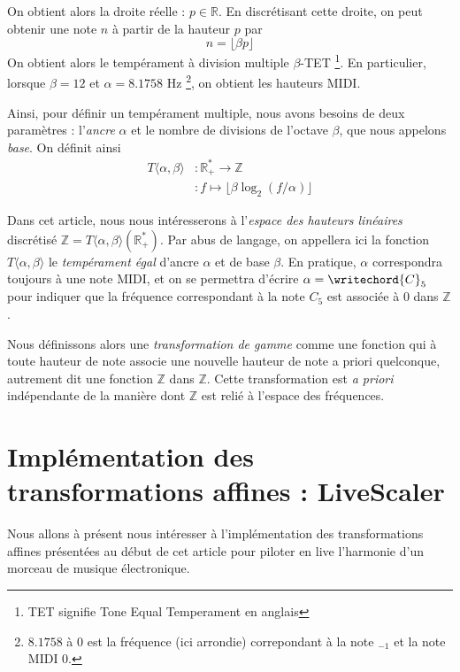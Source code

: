\documentclass{article}
\begin{document}
On obtient alors la droite réelle : $p\in \mathbb{R}$. En discrétisant cette droite, on peut obtenir une note $n$ à partir de la hauteur $p$ par 
$$n = \lfloor \beta p \rfloor$$
On obtient alors le tempérament à division multiple $\beta$-TET \footnote{TET signifie Tone Equal Temperament en anglais}. En particulier, lorsque $\beta = 12$ et $\alpha = 8.1758$ Hz \footnote{ $8.1758$ à $0$ est la fréquence (ici arrondie) correpondant à la note $_{-1}$ et la note MIDI $0$.}, on obtient les hauteurs MIDI.

Ainsi, pour définir un tempérament multiple, nous avons besoins de deux paramètres : l'\emph{ancre} $\alpha$  et le nombre de divisions de l'octave $\beta$, que nous appelons \emph{base}. On définit ainsi \begin{align*}
  T\langle \alpha, \beta \rangle &: \mathbb{R}_+^* \rightarrow \mathbb{Z}\\
  &:f \mapsto \lfloor \beta \log_2(f/\alpha)\rfloor
\end{align*}


Dans cet article, nous nous intéresserons à l'\emph{espace des hauteurs linéaires} discrétisé $\mathbb{Z} = T\langle\alpha, \beta \rangle (\mathbb{R^*_+})$. Par abus de langage, on appellera ici la fonction $T\langle \alpha, \beta \rangle$ le \emph{tempérament égal} d'ancre $\alpha$ et de base $\beta$. En pratique, $\alpha$ correspondra toujours à une note MIDI, et on se permettra d'écrire $\alpha = \writechord{C}_5$ pour indiquer que la fréquence correspondant à la note $C_5$ est associée à $0$ dans $\mathbb{Z}$.

Nous définissons alors une \emph{transformation de gamme} comme une fonction qui à toute hauteur de note associe une nouvelle hauteur de note a priori quelconque, autrement dit une fonction $\mathbb{Z}$ dans $\mathbb{Z}$. Cette transformation est \emph{a priori} indépendante de la manière dont $\mathbb{Z}$ est relié à l'espace des fréquences.










\section{Implémentation des transformations affines : LiveScaler}
Nous allons à présent nous intéresser à l'implémentation des transformations affines présentées au début de cet article pour piloter en live l'harmonie d'un morceau de musique électronique. 
\end{document}
